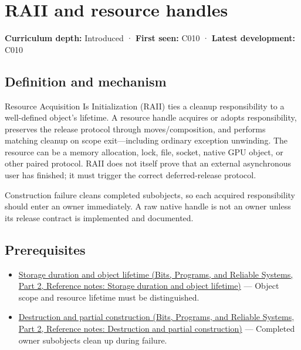 \hypertarget{appendix-69739d3ab49b}{}\label{referencestart:appendix-69739d3ab49b}
\section{RAII and resource handles}\label{appendix-69739d3ab49b-raii-and-resource-handles}

\hypertarget{appendix-69739d3ab49b-raii-and-resource-handles}{}

\textbf{Curriculum depth:} Introduced · \textbf{First seen:} C010 · \textbf{Latest development:} C010

\begin{allmightroledefinition}

\subsection{Definition and mechanism}\label{appendix-69739d3ab49b-definition-and-mechanism}

\hypertarget{appendix-69739d3ab49b-definition-and-mechanism}{}

Resource Acquisition Is Initialization (RAII) ties a cleanup responsibility to a well-defined object's lifetime. A resource handle acquires or adopts responsibility, preserves the release protocol through moves/composition, and performs matching cleanup on scope exit---including ordinary exception unwinding. The resource can be a memory allocation, lock, file, socket, native GPU object, or other paired protocol. RAII does not itself prove that an external asynchronous user has finished; it must trigger the correct deferred-release protocol.

\end{allmightroledefinition}

Construction failure cleans completed subobjects, so each acquired responsibility should enter an owner immediately. A raw native handle is not an owner unless its release contract is implemented and documented.

\subsection{Prerequisites}\label{appendix-69739d3ab49b-prerequisites}

\hypertarget{appendix-69739d3ab49b-prerequisites}{}

\begin{itemize}
\tightlist
\item
  \href{../01-Bits-Programs-and-Reliable-Systems-P02/main.pdf\#appendix-0b104bcba06b}{Storage duration and object lifetime (Bits, Programs, and Reliable Systems, Part 2, Reference notes: Storage duration and object lifetime)} --- Object scope and resource lifetime must be distinguished.
\item
  \href{../01-Bits-Programs-and-Reliable-Systems-P02/main.pdf\#appendix-9bfe377cef7a}{Destruction and partial construction (Bits, Programs, and Reliable Systems, Part 2, Reference notes: Destruction and partial construction)} --- Completed owner subobjects clean up during failure.
\end{itemize}

